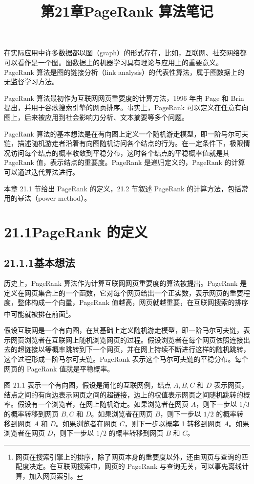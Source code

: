 \documentclass[UTF8,12pt,a4paper,fontset=fandol]{ctexart}
\title{第21章\quad PageRank 算法笔记}
\author{}
\date{}
\begin{document}
\maketitle

在实际应用中许多数据都以图（graph）的形式存在，比如，互联网、社交网络都可以看作是一个图。图数据上的机器学习具有理论与应用上的重要意义。PageRank 算法是图的链接分析（link analysis）的代表性算法，属于图数据上的无监督学习方法。

PageRank 算法最初作为互联网网页重要度的计算方法，1996 年由 Page 和 Brin 提出，并用于谷歌搜索引擎的网页排序。事实上，PageRank 可以定义在任意有向图上，后来被应用到社会影响力分析、文本摘要等多个问题。

PageRank 算法的基本想法是在有向图上定义一个随机游走模型，即一阶马尔可夫链，描述随机游走者沿着有向图随机访问各个结点的行为。在一定条件下，极限情况访问每个结点的概率收敛到平稳分布，这时各个结点的平稳概率值就是其 PageRank 值，表示结点的重要度。PageRank 是递归定义的，PageRank 的计算可以通过迭代算法进行。

本章 21.1 节给出 PageRank 的定义，21.2 节叙述 PageRank 的计算方法，包括常用的幂法（power method）。

\section*{21.1\quad PageRank 的定义}

\subsection*{21.1.1\quad 基本想法}

历史上，PageRank 算法作为计算互联网网页重要度的算法被提出。PageRank 是定义在网页集合上的一个函数，它对每个网页给出一个正实数，表示网页的重要程度，整体构成一个向量，PageRank 值越高，网页就越重要，在互联网搜索的排序中可能就被排在前面\footnote{网页在搜索引擎上的排序，除了网页本身的重要度以外，还由网页与查询的匹配度决定。在互联网搜索中，网页的 PageRank 与查询无关，可以事先离线计算，加入网页索引。}。

假设互联网是一个有向图，在其基础上定义随机游走模型，即一阶马尔可夫链，表示网页浏览者在互联网上随机浏览网页的过程。假设浏览者在每个网页依照连接出去的超链接以等概率跳转到下一个网页，并在网上持续不断进行这样的随机跳转，这个过程形成一阶马尔可夫链。PageRank 表示这个马尔可夫链的平稳分布。每个网页的 PageRank 值就是平稳概率。

图 21.1 表示一个有向图，假设是简化的互联网例，结点 $A,B,C$ 和 $D$ 表示网页，结点之间的有向边表示网页之间的超链接，边上的权值表示网页之间随机跳转的概率。假设有一个浏览者，在网上随机游走。如果浏览者在网页 $A$，则下一步以 $1/3$ 的概率转移到网页 $B,C$ 和 $D$。如果浏览者在网页 $B$，则下一步以 $1/2$ 的概率转移到网页 $A$ 和 $D$。如果浏览者在网页 $C$，则下一步以概率 1 转移到网页 $A$。如果浏览者在网页 $D$，则下一步以 $1/2$ 的概率转移到网页 $B$ 和 $C$。
\end{document}
